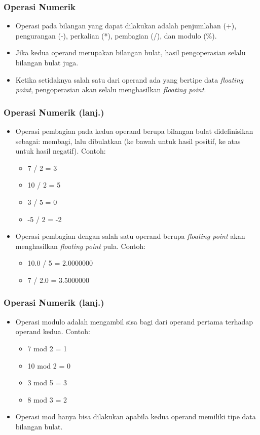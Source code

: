 \begin{frame}
\frametitle{Operasi Numerik}
\begin{itemize}
  \item Operasi pada bilangan yang dapat dilakukan adalah penjumlahan (+), pengurangan (-), perkalian (*), pembagian (/), dan modulo (\%).
  \item Jika kedua operand merupakan bilangan bulat, hasil pengoperasian selalu bilangan bulat juga.
  \item Ketika setidaknya salah satu dari operand ada yang bertipe data \textit{floating point}, pengoperasian akan selalu menghasilkan \textit{floating point}.
\end{itemize}
\end{frame}

\begin{frame}
\frametitle{Operasi Numerik (lanj.)}
\begin{itemize}
  \item Operasi pembagian pada kedua operand berupa bilangan bulat didefinisikan sebagai: membagi, lalu dibulatkan (ke bawah untuk hasil positif, ke atas untuk hasil negatif). Contoh:
  \begin{itemize}
    \item 7 / 2 = 3
    \item 10 / 2 = 5
    \item 3 / 5 = 0
    \item -5 / 2 = -2
  \end{itemize}
  \item Operasi pembagian dengan salah satu operand berupa \textit{floating point} akan menghasilkan \textit{floating point} pula. Contoh:
    \begin{itemize}
      \item 10.0 / 5 = 2.0000000
      \item 7 / 2.0 = 3.5000000
    \end{itemize}
\end{itemize}
\end{frame}

\begin{frame}
\frametitle{Operasi Numerik (lanj.)}
\begin{itemize}
  \item Operasi modulo adalah mengambil sisa bagi dari operand pertama terhadap operand kedua. Contoh:
  \begin{itemize}
    \item 7 mod 2 = 1
    \item 10 mod 2 = 0
    \item 3 mod 5 = 3
    \item 8 mod 3 = 2
  \end{itemize}
  \item Operasi mod hanya bisa dilakukan apabila kedua operand memiliki tipe data \alert{bilangan bulat}.
\end{itemize}
\end{frame}


